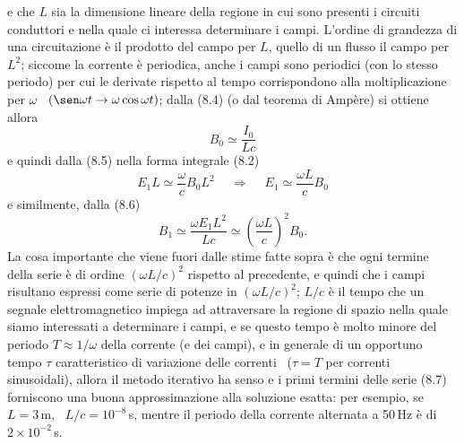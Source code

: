 e che $L$ sia la dimensione lineare della regione in cui sono presenti i
circuiti conduttori e nella quale ci interessa determinare i campi. L'ordine di
grandezza di una circuitazione \`e il prodotto del campo per $L$, quello di un
flusso il campo per $L^2$; siccome la corrente \`e periodica, anche i campi sono
periodici (con lo stesso periodo) per cui le derivate rispetto al tempo
corrispondono alla moltiplicazione per $\omega$
\ $(\sen\omega t\to\omega\cos\omega t)$; dalla (8.4) (o dal teorema di Amp\`ere)
si ottiene allora
\begin{equation}
  B_0\simeq\frac{I_0}{Lc}
  \tag{8.9}
\end{equation}
e quindi dalla (8.5) nella forma integrale (8.2)
\begin{equation}
  E_1L\simeq\frac{\omega}{c}B_0L^2
  \quad\ \Rightarrow\quad\ E_1\simeq\frac{\omega L}{c}B_0
  \tag{8.10}
\end{equation}
e similmente, dalla (8.6)
\begin{equation}
  B_1\simeq\frac{\omega E_1L^2}{Lc}\simeq\left(\frac{\omega L}{c}\right)^2B_0.
  \tag{8.11}
\end{equation}
La cosa importante che viene fuori dalle stime fatte sopra \`e che ogni termine
della serie \`e di ordine $(\omega L/c)^2$ rispetto al precedente, e quindi che
i campi risultano espressi come serie di potenze in $(\omega L/c)^2$; $L/c$ \`e
il tempo che un segnale elettromagnetico impiega ad attraversare la regione di
spazio nella quale siamo interessati a determinare i campi, e se questo tempo
\`e molto minore del periodo $T\approx1/\omega$ della corrente (e dei campi), e
in generale di un opportuno tempo $\tau$ caratteristico di variazione delle
correnti \ ($\tau=T$ per correnti sinusoidali), allora il metodo iterativo ha
senso e i primi termini delle serie (8.7) forniscono una buona approssimazione
alla soluzione esatta: per esempio, se $L=3$\,m, \ $L/c=10^{-8}$\,s, mentre il
periodo della corrente alternata a 50\,Hz \`e di $2\times10^{-2}$\,s.

